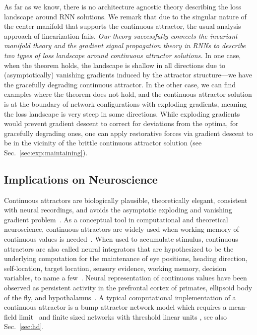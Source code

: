 \documentclass{article} %
\newcounter{ct}
\theoremstyle{definition}
\theoremstyle{remark}
\renewcommand{\cite}{\citep}
\begin{document}
As far as we know, there is no architecture agnostic theory describing the loss landscape around RNN solutions.
We remark that due to the singular nature of the center manifold that supports the continuous attractor, the usual analysis approach of linearization fails.
\emph{Our theory successfully connects the invariant manifold theory and the gradient signal propagation theory in RNNs to describe two types of loss landscape around continuous attractor solutions.}
In one case, when the theorem holds, the landscape is shallow in all directions due to (asymptotically) vanishing gradients induced by the attractor structure---we have the gracefully degrading continuous attractor.
In the other case, we can find examples where the theorem does not hold, and the continuous attractor solution is at the boundary of network configurations with exploding gradients, meaning the loss landscape is very steep in some directions.
While exploding gradients would prevent gradient descent to correct for deviations from the optima,
for gracefully degrading ones, one can apply restorative forces via gradient descent to be in the vicinity of the brittle continuous attractor solution (see Sec.~\ref{sec:exp:maintaining}).


\subsection{Implications on Neuroscience}\label{sec:imp:neuroscience}
Continuous attractors are biologically plausible, theoretically elegant, consistent with neural recordings, and avoids the asymptotic exploding and vanishing gradient problem~\cite{Park2023a}.
As a conceptual tool in computational and theoretical neuroscience, continuous attractors are widely used when working memory of continuous values is needed~\cite{Dayan2001,Burak2009,Khona2022}.
When used to accumulate stimulus, continuous attractors are also called neural integrators that are hypothesized to be the underlying computation for the maintenance of eye positions, heading direction, self-location, target location, sensory evidence, working memory, decision variables, to name a few~\cite{seung1996,Seung2000,Romo1999}.
Neural representation of continuous values have been observed as persistent activity in the prefrontal cortex of primates, ellipsoid body of the fly, and hypothalamus~\cite{Romo1999,Noorman2022,Nair2023}.
A typical computational implementation of a continuous attractor is a bump attractor network model which requires a mean-field limit~\cite{Skaggs1995,Camperi1998,Renart2003} and finite sized networks with threshold linear units \cite{Noorman2022,Spalla2021}, see also Sec.~\ref{sec:hd}.
\end{document}
